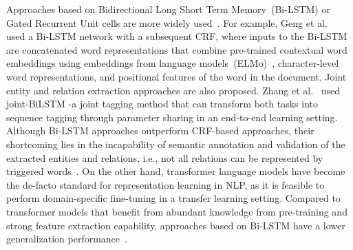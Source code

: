\hspace*{3.5mm} Approaches based on Bidirectional Long Short Term Memory~(Bi-LSTM) or Gated Recurrent Unit cells are more widely used~\cite{zheng2017joint}. For example, Geng et al.~\cite{zhang2020semi} used a Bi-LSTM network with a subsequent CRF, where inputs to the Bi-LSTM are concatenated word representations that combine pre-trained contextual word embeddings using embeddings from language models~(ELMo)~\cite{peters2018deep}, character-level word representations, and positional features of the word in the document. Joint entity and relation extraction approaches are also proposed. Zhang et al.~\cite{zheng2017joint} used joint-BiLSTM -a joint tagging method that can transform both tasks into sequence tagging through parameter sharing in an end-to-end learning setting. Although Bi-LSTM approaches outperform CRF-based approaches, their shortcoming lies in the incapability of semantic annotation and validation of the extracted entities and relations, i.e., not all relations can be represented by triggered words~\cite{sun2020biomedical}. 
On the other hand, transformer language models have become the de-facto standard for representation learning in NLP, as it is feasible to perform domain-specific fine-tuning in a transfer learning setting. Compared to transformer models that benefit from abundant knowledge from pre-training and strong feature extraction capability, approaches based on Bi-LSTM have a lower generalization performance~\cite{xue2019fine}. 

